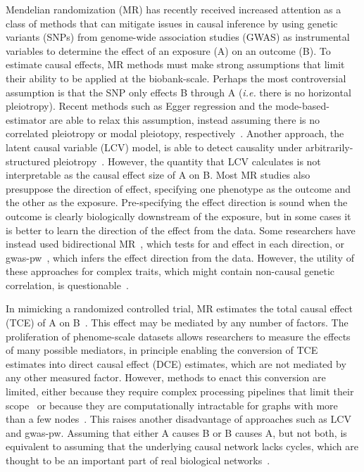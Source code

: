 \documentclass{article}
\begin{document}
Mendelian randomization (MR) has recently received increased attention as a class of methods
that can mitigate issues in causal inference
 by using genetic variants (SNPs) from genome-wide
association studies (GWAS) as instrumental variables to determine the effect
of an exposure (A) on an outcome (B). To estimate causal effects,
MR methods must make strong assumptions that limit their
ability to be applied at the biobank-scale. Perhaps the most
controversial assumption is that the SNP only effects B through A
(\textit{i.e.} there is no horizontal pleiotropy). Recent methods such as Egger
regression and the mode-based-estimator are able to relax this assumption, instead
assuming there is no correlated pleiotropy or modal pleiotopy, respectively~\cite{Bowden2015,Hartwig2017}.
Another approach, the latent causal variable (LCV) model, is able to detect causality
under arbitrarily-structured pleiotropy~\cite{OConnor2018}. However, the quantity that LCV
calculates is not interpretable as the causal effect size of A on B. Most MR studies
also presuppose the direction of effect, specifying one phenotype as the outcome and
the other as the exposure. Pre-specifying the effect direction is sound when the outcome
is clearly biologically downstream of the exposure, but in some cases it is better
to learn the direction of the effect from the data.
Some researchers have instead used bidirectional MR~\cite{Timpson2011, Richmond2014}, which tests for
and effect in each direction, or gwas-pw~\cite{Pickrell2016}, which infers the effect
direction from the data.
However, the utility of these approaches for complex traits,
which might contain non-causal genetic correlation,
is questionable~\cite{OConnor2018}.

In mimicking a randomized controlled trial, MR estimates the
total causal effect (TCE) of A on B~\cite{Burgess2015}. This effect may be mediated by
any number of factors. The proliferation of phenome-scale datasets
allows researchers to measure the effects of many possible mediators,
in principle enabling the conversion of TCE estimates into direct causal effect (DCE)
estimates, which are not mediated by any other measured factor.
However, methods to enact this conversion are limited, either because they require complex
processing pipelines that limit their scope~\cite{Amar2019} or because they are
computationally intractable for graphs with more than a few nodes~\cite{Badsha2019}.
This raises another disadvantage of approaches such as LCV and gwas-pw. Assuming that either
A causes B or B causes A, but not both, is equivalent to assuming
that the underlying causal network
lacks cycles, which are thought to be an important part of real biological networks~\cite{Zhu2007}.
\end{document}
